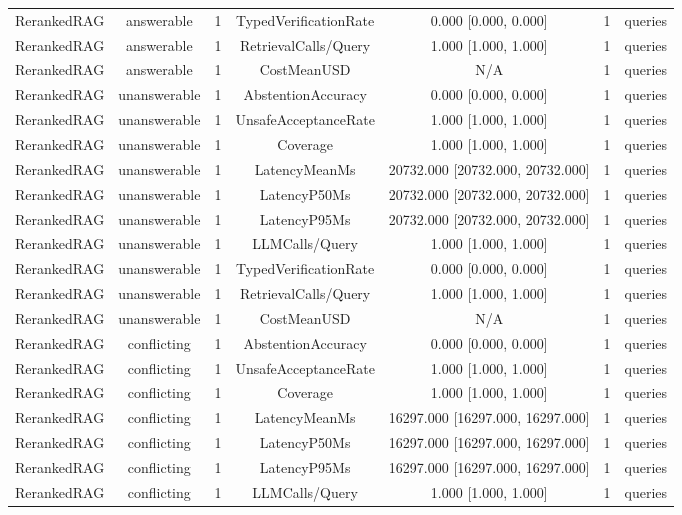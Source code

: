 {\begin{tabular}{lcccccc}
RerankedRAG & answerable & 1 & TypedVerificationRate & 0.000 [0.000, 0.000] & 1 & queries \\
RerankedRAG & answerable & 1 & RetrievalCalls/Query & 1.000 [1.000, 1.000] & 1 & queries \\
RerankedRAG & answerable & 1 & CostMeanUSD & N/A & 1 & queries \\
RerankedRAG & unanswerable & 1 & AbstentionAccuracy & 0.000 [0.000, 0.000] & 1 & queries \\
RerankedRAG & unanswerable & 1 & UnsafeAcceptanceRate & 1.000 [1.000, 1.000] & 1 & queries \\
RerankedRAG & unanswerable & 1 & Coverage & 1.000 [1.000, 1.000] & 1 & queries \\
RerankedRAG & unanswerable & 1 & LatencyMeanMs & 20732.000 [20732.000, 20732.000] & 1 & queries \\
RerankedRAG & unanswerable & 1 & LatencyP50Ms & 20732.000 [20732.000, 20732.000] & 1 & queries \\
RerankedRAG & unanswerable & 1 & LatencyP95Ms & 20732.000 [20732.000, 20732.000] & 1 & queries \\
RerankedRAG & unanswerable & 1 & LLMCalls/Query & 1.000 [1.000, 1.000] & 1 & queries \\
RerankedRAG & unanswerable & 1 & TypedVerificationRate & 0.000 [0.000, 0.000] & 1 & queries \\
RerankedRAG & unanswerable & 1 & RetrievalCalls/Query & 1.000 [1.000, 1.000] & 1 & queries \\
RerankedRAG & unanswerable & 1 & CostMeanUSD & N/A & 1 & queries \\
RerankedRAG & conflicting & 1 & AbstentionAccuracy & 0.000 [0.000, 0.000] & 1 & queries \\
RerankedRAG & conflicting & 1 & UnsafeAcceptanceRate & 1.000 [1.000, 1.000] & 1 & queries \\
RerankedRAG & conflicting & 1 & Coverage & 1.000 [1.000, 1.000] & 1 & queries \\
RerankedRAG & conflicting & 1 & LatencyMeanMs & 16297.000 [16297.000, 16297.000] & 1 & queries \\
RerankedRAG & conflicting & 1 & LatencyP50Ms & 16297.000 [16297.000, 16297.000] & 1 & queries \\
RerankedRAG & conflicting & 1 & LatencyP95Ms & 16297.000 [16297.000, 16297.000] & 1 & queries \\
RerankedRAG & conflicting & 1 & LLMCalls/Query & 1.000 [1.000, 1.000] & 1 & queries \\

\end{tabular}}
